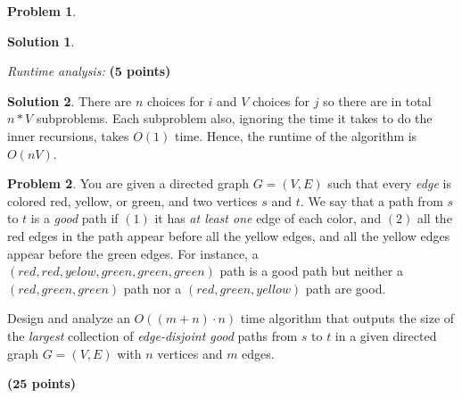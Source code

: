 \documentclass{article}
\theoremstyle{definition}
\newtheorem{problem}{Problem}
\newtheorem*{solution*}{Solution}
\newenvironment{solution}{\begin{solution*}}{{} \end{solution*}}
\newcommand{\grade}[1]{\hfill{\textbf{($\mathbf{#1}$ points)}}}
\begin{document}
\begin{problem}
\begin{enumerate}[label=(\alph*)]
\begin{solution}
		\end{solution}
		
	\vfill
	
	\item \emph{Runtime analysis:} \grade{5}
	
		\medskip
		\begin{solution}
		\item There are $n$ choices for $i$ and $V$ choices for $j$ so there are in total $n*V$ subproblems. Each subproblem also, ignoring the time it takes to do the inner recursions, takes $O(1)$ time.  Hence, the runtime of the algorithm is $O(nV)$.
		\end{solution}
		
	\vfill
\end{enumerate}

\end{problem} 

\newpage




\newpage



\begin{problem}\label{flow}
	You are given a directed graph $G=(V,E)$ such that every \emph{edge} is colored red, yellow, or green, and two vertices $s$ and $t$. We say that a path from $s$ to $t$ 
	is a \emph{good} path if $(1)$ it has \emph{at least one} edge of each color, and $(2)$ all the red edges in the path appear before all the yellow edges, and all the yellow edges appear before the green edges. 
	For instance, a $(red,red,yelow,green,green,green)$ path is a good path but neither a $(red,green,green)$ path nor a $(red,green,yellow)$ path are good. 
	
	Design and analyze an $O((m+n) \cdot n)$ time algorithm that outputs the size of the \emph{largest} collection of \emph{edge-disjoint good} paths from $s$ to $t$ in a given directed graph $G=(V,E)$ with $n$ vertices and $m$ edges. 
	
	\grade{25}
\end{problem}
\end{document}
